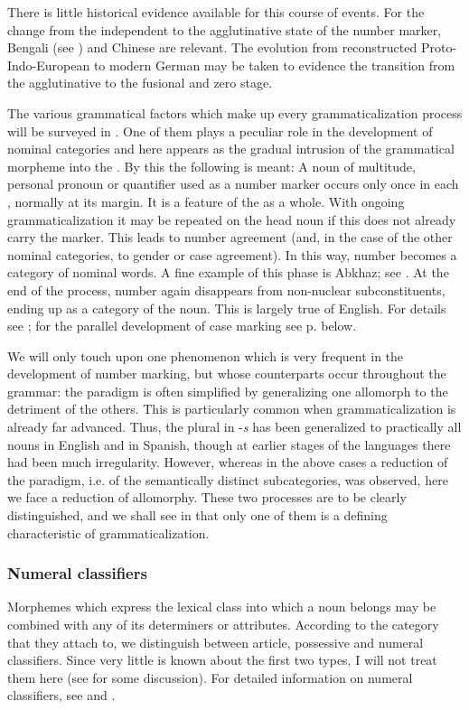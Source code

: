 There is little historical evidence available for this course of events. For the change from the independent to the agglutinative state of the number marker, Bengali (see \citealt{Kölver1982a}) and Chinese are relevant. The evolution from reconstructed Proto-Indo-European to modern German may be taken to evidence the transition from the agglutinative to the fusional and zero stage.

\label{page63}The various grammatical factors which make up every grammaticalization process will be surveyed in . One of them plays a peculiar role in the development of nominal categories and here appears as the gradual intrusion of the grammatical morpheme into the \np. By this the following is meant: A noun of multitude, personal pronoun or quantifier used as a number marker occurs only once in each \np, normally at its margin. It is a feature of the \np as a whole. With ongoing grammaticalization it may be repeated on the head noun if this does not already carry the marker. This leads to number agreement (and, in the case of the other nominal categories, to gender or case agreement). In this way, number becomes a category of nominal words. A fine example of this phase is Abkhaz; see \citet[222f]{Hewitt1979}. At the end of the process, number again disappears from non-nuclear subconstituents, ending up as a category of the noun. This is largely true of English. For details see \citealt[§6.3]{Lehmann1982b}; for the parallel development of case marking see p. \pageref{page92}\chk%
  below.

We will only touch upon one phenomenon which is very frequent in the development of number marking, but whose counterparts occur throughout the grammar: the paradigm is often simplified by generalizing one allomorph to the detriment of the others. This is particularly common when grammaticalization is already far advanced. Thus, the plural in -\textit{s} has been generalized to practically all nouns in English and in Spanish, though at earlier stages of the languages there had been much irregularity. However, whereas in the above cases a reduction of the paradigm, i.e. of the semantically distinct subcategories, was observed, here we face a reduction of allomorphy. These two processes are to be clearly distinguished, and we shall see in  that only one of them is a defining characteristic of grammaticalization.

\subsubsection{Numeral classifiers}
Morphemes which express the lexical class into which a noun belongs may be combined with any of its determiners or attributes. According to the category that they attach to, we distinguish between article, possessive and numeral classifiers. Since very little is known about the first two types, I will not treat them here (see \citealt[§6.3.3]{Lehmann1982b} for some discussion). For detailed information on numeral classifiers, see \citealt{Kölver1982b} and \citealt{Serzisko1980,Serzisko1982}.

